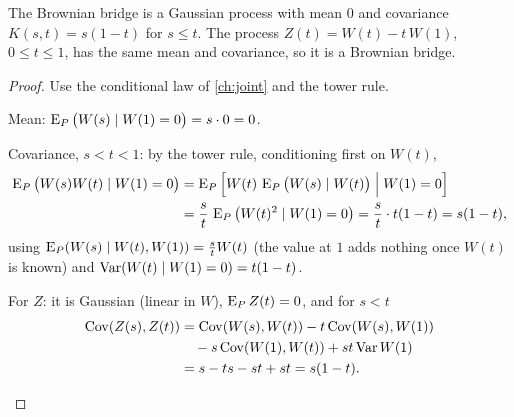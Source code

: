 \begin{theorem}
\label{thm:bridge}
The Brownian bridge is a Gaussian process with mean $0$ and covariance $K(s,t)=s(1-t)$ for $s\le t$. The process $Z(t)=W(t)-t\,W(1)$, $0\le t\le1$, has the same mean and covariance, so it is a Brownian bridge.
\end{theorem}
\begin{proof}
Use the conditional law of \cref{ch:joint} and the tower rule.
\begin{steps}
  \item Mean: $\operatorname{E}_P\big(W(s)\mid W(1)=0\big)=s\cdot0=0$.
  \item Covariance, $s<t<1$: by the tower rule, conditioning first on $W(t)$,
  \[
    \begin{aligned}
    \operatorname{E}_P\big(W(s)W(t)\mid W(1)=0\big)&=\operatorname{E}_P\Big[W(t)\,\operatorname{E}_P\big(W(s)\mid W(t)\big)\Bigm| W(1)=0\Big]\\
    &=\frac st\,\operatorname{E}_P\big(W(t)^2\mid W(1)=0\big)=\frac st\cdot t(1-t)=s(1-t),
    \end{aligned}
  \]
  using $\operatorname{E}_P(W(s)\mid W(t),W(1))=\frac stW(t)$ (the value at $1$ adds nothing once $W(t)$ is known) and $\operatorname{Var}(W(t)\mid W(1)=0)=t(1-t)$.
  \item For $Z$: it is Gaussian (linear in $W$), $\operatorname{E}_PZ(t)=0$, and for $s<t$
  \[
    \begin{aligned}
    \operatorname{Cov}(Z(s),Z(t))&=\operatorname{Cov}(W(s),W(t))-t\operatorname{Cov}(W(s),W(1))\\
    &\quad-s\operatorname{Cov}(W(1),W(t))+st\operatorname{Var} W(1)\\
    &=s-ts-st+st=s(1-t). \qedhere
    \end{aligned}
  \]
\end{steps}
\end{proof}

\begin{pic}
\end{pic}

